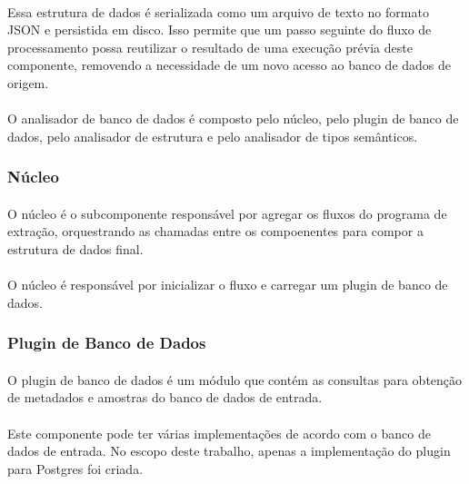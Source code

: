 \paragraph{} Essa estrutura de dados é serializada como um arquivo de texto no formato JSON e persistida em disco. Isso permite que um passo seguinte do fluxo de processamento possa reutilizar o resultado de uma execução prévia deste componente, removendo a necessidade de um novo acesso ao banco de dados de origem.

\paragraph{} O analisador de banco de dados é composto pelo núcleo, pelo plugin de banco de dados, pelo analisador de estrutura e pelo analisador de tipos semânticos.

\subsubsection{Núcleo}

\paragraph{} O núcleo é o subcomponente responsável por agregar os fluxos do programa de extração, orquestrando as chamadas entre os compoenentes para compor a estrutura de dados final.

\paragraph{} O núcleo é responsável por inicializar o fluxo e carregar um plugin de banco de dados.

\subsubsection{Plugin de Banco de Dados}

\paragraph{} O plugin de banco de dados é um módulo que contém as consultas para obtenção de metadados e amostras do banco de dados de entrada.

\paragraph{} Este componente pode ter várias implementações de acordo com o banco de dados de entrada. No escopo deste trabalho, apenas a implementação do plugin para Postgres foi criada.

